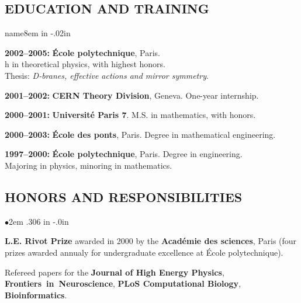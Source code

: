 \documentclass[a4paper, 12pt]{scrartcl}
\newcommand{\respSpace}{\vspace{-0.25in}}
\begin{document}
\subsection*{\sc\bf EDUCATION AND TRAINING}           
\vspace{-0.14in}          
\begin{list}{name}{ 8em  in \itemsep -.02in }
\item [\bf 2002--2005:] {\bf \'Ecole polytechnique}, Paris.\\
                     {}h{} in theoretical physics, with highest {\hbox{honors}}.\\
\vspace{-0.12in} 
\hspace{-0.09in}Thesis: {\em D-branes, effective actions and mirror symmetry}.\\ 
\hspace{-.14in}
 \vspace {-.06in}
 \item [\bf 2001--2002:] {\bf CERN Theory Division}, Geneva. One-year internship.\\
 \vspace {-.14in}
 \item [\bf 2000--2001:] {\bf Universit\'e Paris 7}. M.S. in mathematics, with honors.\\
\vspace {-.14in}
 \item [\bf 2000--2003:] {\bf \'Ecole des ponts}, Paris. Degree in mathematical engineering.\\
 \vspace {-.14in}
 \item   [\bf 1997--2000:]  {\bf \'Ecole polytechnique}, Paris. Degree in engineering.\\
              Majoring in physics, minoring in {\hbox{mathematics}}.\\
\end{list}
\vspace {-0.4in}
\subsection*{\sc\bf HONORS AND RESPONSIBILITIES}
\vspace{-0.05in}
\begin{list}{$\bullet$}{ 2em \leftmargin .306 in \itemsep -.0in }
\item  {\bf{L.E. Rivot Prize}} awarded in 2000 by the {\bf Acad\'emie des sciences}, Paris (four 
      prizes awarded annualy for undergraduate excellence at \'Ecole polytechnique).\\
\respSpace
\item Refereed papers for the {\bf Journal of High Energy Physics}, {\bf {\hbox{Frontiers in Neuroscience}}}, {\bf{ PLoS Computational Biology}}, {\bf{Bioinformatics}}.\\
\end{list}
\vspace {-.95in}
 \hspace{-.29in}
\newpage
 \hspace{-.35in}
\vspace{-0.35in}
\end{document}
